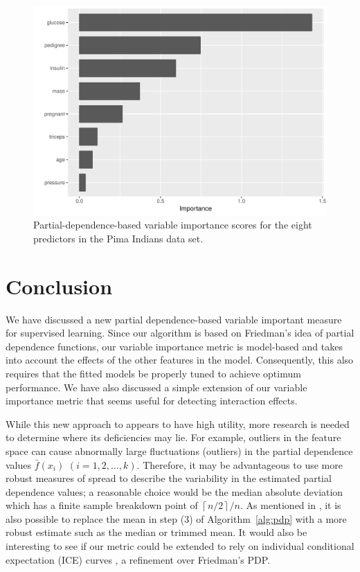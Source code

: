 \documentclass[12pt]{article}
\begin{document}
\begin{figure}[!htb]
  \centering
  \includegraphics[width=1.0\textwidth]{pima-vip}
  \caption{Partial-dependence-based variable importance scores for the eight predictors in the Pima Indians data set. \label{fig:pima-vip}}
\end{figure}


\section{Conclusion}
\label{sec:conc}

We have discussed a new partial dependence-based variable important measure for supervised learning. Since our algorithm is based on Friedman's idea of partial dependence functions, our variable importance metric is model-based and takes into account the effects of the other features in the model. Consequently, this also requires that the fitted models be properly tuned to achieve optimum performance. We have also discussed a simple extension of our variable importance metric that seems useful for detecting interaction effects.

While this new approach to appears to have high utility, more research is needed to determine where its deficiencies may lie. For example, outliers in the feature space can cause abnormally large fluctuations (outliers) in the partial dependence values $\bar{f}\left(x_{i}\right)$ $\left(i = 1, 2, \dots, k\right)$. Therefore, it may be advantageous to use more robust measures of spread to describe the variability in the estimated partial dependence values; a reasonable choice would be the median absolute deviation which has a finite sample breakdown point of $\left\lceil{n / 2}\right\rceil / n$. As mentioned in \citet{pdp-greenwell-2017}, it is also possible to replace the mean in step (3) of Algorithm~\eqref{alg:pdp} with a more robust estimate such as the median or trimmed mean. It would also be interesting to see if our metric could be extended to rely on individual conditional expectation (ICE) curves \citep{goldstein-peeking-2015}, a refinement over Friedman's PDP.
\end{document}
